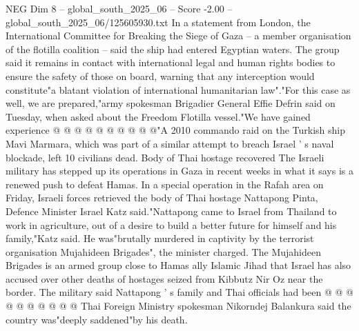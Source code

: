 \begin{textsample}{NEG Dim 8 – global\_south\_2025\_06 – Score -2.00 – global\_south\_2025\_06/125605930.txt}
In a statement from London, the International Committee for Breaking the Siege of Gaza -- a member organisation of the flotilla coalition -- said the ship had entered Egyptian waters.
The group said it remains in contact with international legal and human rights bodies to ensure the safety of those on board, warning that any interception would constitute"a blatant violation of international humanitarian law"."For this case as well, we are prepared,"army spokesman Brigadier General Effie Defrin said on Tuesday, when asked about the Freedom Flotilla vessel."We have gained experience @ @ @ @ @ @ @ @ @ @"A 2010 commando raid on the Turkish ship Mavi Marmara, which was part of a similar attempt to breach Israel ' s naval blockade, left 10 civilians dead.
Body of Thai hostage recovered The Israeli military has stepped up its operations in Gaza in recent weeks in what it says is a renewed push to defeat Hamas.
In a special operation in the Rafah area on Friday, Israeli forces retrieved the body of Thai hostage Nattapong Pinta, Defence Minister Israel Katz said."Nattapong came to Israel from Thailand to work in agriculture, out of a desire to build a better future for himself and his family,"Katz said.
He was"brutally murdered in captivity by the terrorist organisation Mujahideen Brigades", the minister charged.
The Mujahideen Brigades is an armed group close to Hamas ally Islamic Jihad that Israel has also accused over other deaths of hostages seized from Kibbutz Nir Oz near the border.
The military said Nattapong ' s family and Thai officials had been @ @ @ @ @ @ @ @ @ @ Thai Foreign Ministry spokesman Nikorndej Balankura said the country was"deeply saddened"by his death.

\end{textsample}
